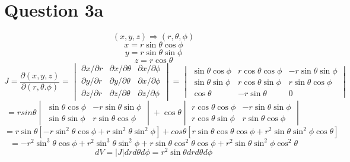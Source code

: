 \documentclass[11pt]{article}
\begin{document}
\section*{Question 3a}
\[(x,y,z) \Rightarrow (r, \theta, \phi)\]
\[x=r\sin\theta\cos\phi\] \[y=r\sin\theta\sin\phi\]
\[z=r\cos\theta\]
\[J= \frac{\partial(x,y,z)}{\partial(r,\theta.\phi)}
=\begin{vmatrix}
\partial x/\partial r & \partial x/\partial \theta & \partial x/\partial \phi\\
\partial y/\partial r & \partial y/\partial \theta & \partial x/\partial \phi\\
\partial z/\partial r & \partial z/\partial \theta & \partial z/\partial \phi
\end{vmatrix}=
\begin{vmatrix}
\sin\theta\cos\phi & r\cos\theta\cos\phi & -r\sin\theta\sin\phi\\
\sin\theta\sin\phi & r\cos\theta\sin\phi & r\sin\theta\cos\phi\\
\cos\theta & -r\sin\theta & 0
\end{vmatrix}\]
\[=rsin\theta \begin{vmatrix}
\sin\theta\cos\phi & -r\sin\theta\sin\phi \\
\sin\theta\sin\phi & r\sin\theta\cos\phi
\end{vmatrix}+\cos\theta\begin{vmatrix}
r\cos\theta\cos\phi & -r\sin\theta\sin\phi \\
r\cos\theta\sin\phi & r\sin\theta\cos\phi
\end{vmatrix}\]
\[=r\sin\theta[-r\sin^2\theta\cos\phi+
r\sin^2\theta\sin^2\phi]+cos\theta[r\sin\theta\cos\theta\cos\phi + r^2\sin\theta\sin^2\phi\cos\theta]\]
\[=-r^2\sin^3\theta\cos\phi+r^2\sin^3\theta\sin^2\phi+r\sin\theta\cos^2\theta\cos\phi+r^2\sin\theta\sin^2\phi\cos^2\theta\]
\[dV=|J|drd\theta d\phi=r^2\sin\theta drd\theta d\phi\]
\end{document}
